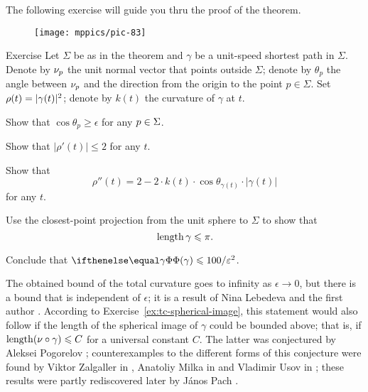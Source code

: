 The following exercise will guide you thru the proof of the theorem. 

\begin{wrapfigure}{r}{48 mm}
\vskip-0mm
\centering
\texttt{[image: mppics/pic-83]}
\vskip-0mm
\end{wrapfigure}

\begin{thm}{Exercise}\label{ex:bound-tc}
Let $\Sigma$ be as in the theorem and $\gamma$ be a unit-speed shortest path in $\Sigma$.
Denote by $\nu_p$ the unit normal vector that points outside $\Sigma$;
denote by $\theta_p$ the angle between $\nu_p$ and the direction from the origin to the point $p\in\Sigma$.
Set $\rho(t)\z=|\gamma(t)|^2$; denote by $k(t)$ the curvature of $\gamma$ at $t$.

\begin{subthm}{}
Show that $\cos\theta_p\ge \epsilon$ for any $p\z\in \Sigma$.
\end{subthm}

\begin{subthm}{}
 Show that $|\rho'(t)|\le 2$ for any $t$.
\end{subthm}

\begin{subthm}{}
 Show that 
\[\rho''(t)=2-2\cdot k(t)\cdot \cos \theta_{\gamma(t)}\cdot |\gamma(t)|\]
for any $t$.
\end{subthm}

\begin{subthm}{}
 Use the closest-point projection from the unit sphere to $\Sigma$ to show that 
\[\mathop{\rm length}\nolimits \gamma\leqslant \pi.\]
\end{subthm}

\begin{subthm}{}
Conclude that $\tc\gamma\le 100/\epsilon^2$.
\end{subthm}

\end{thm}

The obtained bound of the total curvature goes to infinity as $\epsilon\to 0$,
but there is a bound that is independent of $\epsilon$;
it is a result of Nina Lebedeva and the first author \cite{lebedeva-petrunin}.
According to Exercise~\ref{ex:tc-spherical-image}, this statement would also follow if the length of the spherical image of $\gamma$ could be bounded above; 
that is, if $\mathop{\rm length}\nolimits(\nu\circ\gamma)\leqslant C$ for a universal constant $C$.
The latter was conjectured by Aleksei Pogorelov \cite{pogorelov};
counterexamples to the different forms of this conjecture were found 
by Viktor Zalgaller in \cite{zalgaller},
Anatoliy Milka in \cite{milka}
and Vladimir Usov in \cite{usov};
these results were partly rediscovered later 
by J\'{a}nos Pach \cite{pach}.
